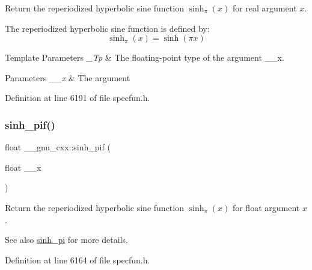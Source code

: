 Return the reperiodized hyperbolic sine function $ \sinh_\pi(x) $ for real argument $ x $.

The reperiodized hyperbolic sine function is defined by\+: \[ \sinh_\pi(x) = \sinh(\pi x) \]


\begin{DoxyTemplParams}{Template Parameters}
{\em \+\_\+\+Tp} & The floating-\/point type of the argument {\ttfamily \+\_\+\+\_\+x}. \\
\hline
\end{DoxyTemplParams}

\begin{DoxyParams}{Parameters}
{\em \+\_\+\+\_\+x} & The argument \\
\hline
\end{DoxyParams}


Definition at line 6191 of file specfun.\+h.

\mbox{\label{group__gnu__math__spec__func_ga74103f57ab0d97126732f3cb276c5ab3}} 
\subsubsection{\texorpdfstring{sinh\+\_\+pif()}{sinh\_pif()}}
{\footnotesize\ttfamily float \+\_\+\+\_\+gnu\+\_\+cxx\+::sinh\+\_\+pif (\begin{DoxyParamCaption}\item[{float}]{\+\_\+\+\_\+x }\end{DoxyParamCaption})\hspace{0.3cm}{\ttfamily [inline]}}

Return the reperiodized hyperbolic sine function $ \sinh_\pi(x) $ for {\ttfamily float} argument $ x $.

\begin{DoxySeeAlso}{See also}
\hyperlink{group__gnu__math__spec__func_gade43453b87b6b38c05b3fcce40870542}{sinh\+\_\+pi} for more details. 
\end{DoxySeeAlso}


Definition at line 6164 of file specfun.\+h.

\mbox{\label{group__gnu__math__spec__func_ga2232ee554ef2a902824db42e2e09c483}} 
